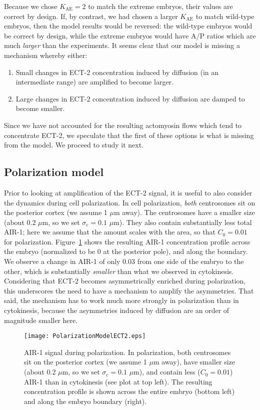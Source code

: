 \documentclass[11pt]{article}
\begin{document}
Because we chose $K_\text{AE}=2$ to match the extreme embryos, their values are correct by design. If, by contrast, we had chosen a larger $K_\text{AE}$ to match wild-type embryos, then the model results would be reversed: the wild-type embryos would be correct by design, while the extreme embryos would have A/P ratios which are much \emph{larger} than the experiments. 
It seems clear that our model is missing a mechanism whereby either:
\begin{enumerate}
\item Small changes in ECT-2 concentration induced by diffusion (in an intermediate range) are amplified to become larger.
\item Large changes in ECT-2 concentration induced by diffusion are damped to become smaller.
\end{enumerate}
Since we have not accounted for the resulting actomyosin flows which tend to concentrate ECT-2, we speculate that the first of these options is what is missing from the model. We proceed to study it next.

\subsection{Polarization model}
Prior to looking at amplification of the ECT-2 signal, it is useful to also consider the dynamics during cell polarization. In cell polarization, \emph{both} centrosomes sit on the posterior cortex (we assume 1 $\mu$m away). The centrosomes have a smaller size (about 0.2 $\mu$m, so we set $\sigma_c=0.1$ $\mu$m). They also contain substantially less total AIR-1; here we assume that the amount scales with the area, so that $C_0=0.01$ for polarization. Figure\ \ref{fig:AIRPol} shows the resulting AIR-1 concentration profile across the embryo (normalized to be 0 at the posterior pole), and along the boundary. We observe a change in AIR-1 of only 0.03 from one side of the embryo to the other, which is substantially \emph{smaller} than what we observed in cytokinesis. Considering that ECT-2 becomes asymmetrically enriched during polarization, this underscores the need to have a mechanism to amplify the asymmetries. That said, the mechanism has to work much more strongly in polarization than in cytokinesis, because the asymmetries induced by diffusion are an order of magnitude smaller here.

\begin{figure}
\centering
\texttt{[image: PolarizationModelECT2.eps]}
\caption{\label{fig:AIRPol}AIR-1 signal during polarization. In polarization, both centrosomes sit on the posterior cortex (we assume 1 $\mu$m away), have smaller size (about 0.2 $\mu$m, so we set $\sigma_c=0.1$ $\mu$m), and contain less ($C_0=0.01$) AIR-1 than in cytokinesis (see plot at top left). The resulting concentration profile is shown across the entire embryo (bottom left) and along the embryo boundary (right).}
\end{figure}
\end{document}
